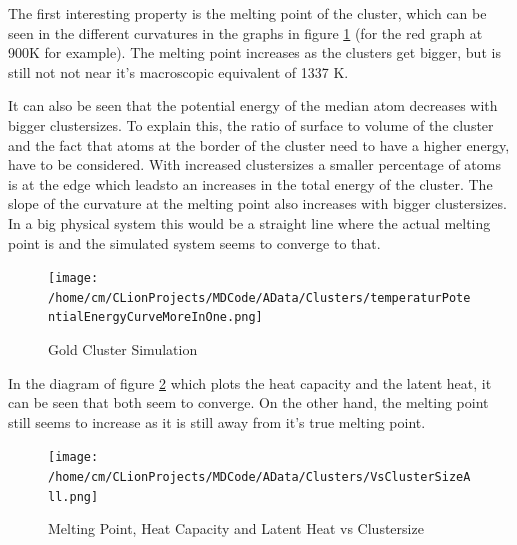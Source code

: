 \par 
The first interesting property is the melting point of the cluster, which can be seen in the different curvatures in the graphs in figure \ref{GoldClusterSimulationTemperaturEnergy4In1} (for the red graph at 900K for example). The melting point increases as the clusters get bigger, but is still not not near it's macroscopic equivalent of 1337 K. 

\par
It can also be seen that the potential energy of the median atom decreases with bigger clustersizes. To explain this, the ratio of surface to volume of the cluster and the fact that atoms at the border of the cluster need to have a higher energy, have to be considered. With increased clustersizes a smaller percentage of atoms is at the edge which leadsto an increases in the total energy of the cluster. 
The slope of the curvature at the melting point also increases with bigger clustersizes. In a big physical system this would be a straight line where the actual melting point is and the simulated system seems to converge to that. 

\begin{figure}
	\begin{center} 
		\texttt{[image: /home/cm/CLionProjects/MDCode/AData/Clusters/temperaturPotentialEnergyCurveMoreInOne.png]} 
	\end{center} 
	\caption[Gold Cluster Simulation]{Gold Cluster Simulation} 
	\label{GoldClusterSimulationTemperaturEnergy4In1} 
\end{figure} 

In the diagram of figure \ref{GoldClusterSimulationVsClustersize} which plots the heat capacity and the latent heat, it can be seen that both seem to converge. On the other hand, the melting point still seems to increase as it is still away from it's true melting point.

\begin{figure}
	\begin{center} 
		\texttt{[image: /home/cm/CLionProjects/MDCode/AData/Clusters/VsClusterSizeAll.png]} 
	\end{center} 
	\caption[Melting Point, Heat Capacity and Latent Heat vs Clustersize]{Melting Point, Heat Capacity and Latent Heat vs Clustersize} 
	\label{GoldClusterSimulationVsClustersize} 
\end{figure} 
